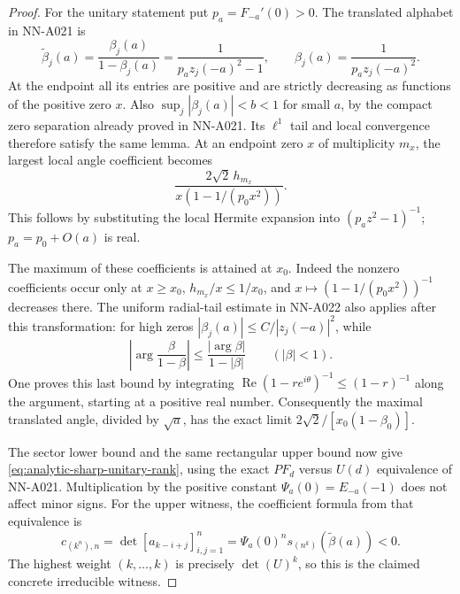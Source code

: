 \begin{proof}
For the unitary statement put $p_a=F_{-a}'(0)>0$. The translated
alphabet in NN-A021 is
\[
 \widetilde\beta_j(a)
   =\frac{\beta_j(a)}{1-\beta_j(a)}
   =\frac1{p_a z_j(-a)^2-1},\qquad
                    \beta_j(a)=\frac1{p_a z_j(-a)^2}.
\]
At the endpoint all its entries are positive and are strictly decreasing
as functions of the positive zero $x$. Also $\sup_j|\beta_j(a)|<b<1$
for small $a$, by the compact zero separation already proved in
NN-A021. Its $\ell^1$ tail and local convergence therefore satisfy
the same lemma. At an endpoint zero $x$ of multiplicity $m_x$,
the largest local angle coefficient becomes
\begin{equation}\label{eq:analytic-translated-angle-coefficient}
 \frac{2\sqrt2\,h_{m_x}}{x(1-1/(p_0x^2))}.
\end{equation}
This follows by substituting the local Hermite expansion into
$(p_a z^2-1)^{-1}$; $p_a=p_0+O(a)$ is real.

The maximum of these coefficients is attained at $x_0$.
Indeed the nonzero coefficients occur only at $x\ge x_0$,
$h_{m_x}/x\le1/x_0$, and
$x\mapsto(1-1/(p_0x^2))^{-1}$ decreases there. The uniform
radial-tail estimate in NN-A022 also applies after this transformation:
for high zeros $|\beta_j(a)|\le C/|z_j(-a)|^2$, while
\[
 \left|\arg\frac{\beta}{1-\beta}\right|
                         \le\frac{|\arg\beta|}{1-|\beta|}
                         \qquad(|\beta|<1).
\]
One proves this last bound by integrating
$\operatorname{Re}(1-re^{i\theta})^{-1}\le(1-r)^{-1}$
along the argument, starting at a positive real number.
Consequently the maximal translated angle, divided by $\sqrt a$,
has the exact limit
$2\sqrt2/[x_0(1-\beta_0)]$.

The sector lower bound and the same rectangular upper bound now give
\eqref{eq:analytic-sharp-unitary-rank}, using the exact $PF_d$
versus $U(d)$ equivalence of NN-A021. Multiplication by the positive
constant $\Psi_a(0)=E_{-a}(-1)$ does not affect minor signs.
For the upper witness, the coefficient formula from that equivalence
is
\[
 c_{(k^n),n}=\det[a_{k-i+j}]_{i,j=1}^n
             =\Psi_a(0)^n s_{(n^k)}(\widetilde\beta(a))<0.
\]
The highest weight $(k,\ldots,k)$ is precisely $\det(U)^k$,
so this is the claimed concrete irreducible witness.
\end{proof}

